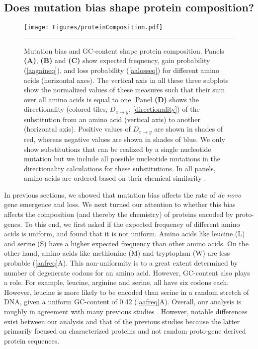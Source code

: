 \documentclass[12pt,a4paper]{article}
\begin{document}
\subsection{Does mutation bias shape protein composition?}

\begin{figure}[!t]
\centering
\texttt{[image: Figures/proteinComposition.pdf]}

\caption{Mutation bias and GC-content shape protein composition. Panels \textbf{(A)}, \textbf{(B)} and \textbf{(C)} show expected frequency, gain probability (\autoref{aagaineq}), and loss probability (\autoref{aalosseq}) for different amino acids (horizontal axes). The vertical axis in all these three subplots show the normalized values of these measures such that their sum over all amino acids is equal to one. Panel \textbf{(D)} shows the directionality (colored tiles, $\textit{D}_{x\to y}$, \autoref{directionality}) of the substitution from an amino acid (vertical axis) to another (horizontal axis). Positive values of $\textit{D}_{x\to y}$ are shown in shades of red, whereas negative values are shown in shades of blue. We only show substitutions that can be realized by a single nucleotide mutation but we include all possible nucleotide mutations in the directionality calculations for these substitutions. In all panels, amino acids are ordered based on their chemical similarity \citep{PMBEC}.}
\label{aafreq}

\vspace{1ex}
\hrule
\end{figure}

In previous sections, we showed that mutation bias affects the rate of \textit{de novo} gene emergence and loss. We next turned our attention to whether this bias affects the composition (and thereby the chemistry) of proteins encoded by proto-genes. To this end, we first asked if the expected frequency of different amino acids is uniform, and found that it is not uniform. Amino acids like leucine (L) and serine (S) have a higher expected frequency than other amino acids. On the other hand, amino acids like methionine (M) and tryptophan (W) are less probable (\autoref{aafreq}{\color{blue}A}). This non-uniformity is to a great extent determined by number of degenerate codons for an amino acid. However, GC-content also plays a role. For example, leucine, arginine and serine, all have six codons each. However, leucine is more likely to be encoded than serine in a random stretch of DNA, given a uniform GC-content of 0.42 (\autoref{aafreq}{\color{blue}A}). Overall, our analysis is roughly in agreement with many previous studies \citep{aasubOhta,aafreq3,aafreq4}. However, notable differences exist between our analysis and that of the previous studies because the latter primarily focused on characterized proteins and not random proto-gene derived protein sequences. 
\end{document}
